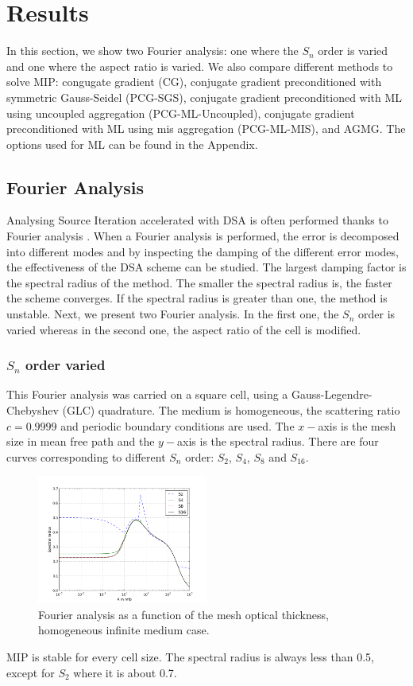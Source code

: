 \section{Results} \label{sec_res}
In this section, we show two Fourier analysis: one where the $S_n$ order is
varied and one where the aspect ratio is varied. We also compare different
methods to solve MIP: congugate gradient (CG), conjugate gradient
preconditioned with symmetric Gauss-Seidel (PCG-SGS), conjugate gradient
preconditioned with ML using uncoupled aggregation (PCG-ML-Uncoupled),
conjugate gradient preconditioned with ML using mis aggregation (PCG-ML-MIS),
and AGMG. The options used for ML can be found in the Appendix.
\subsection{Fourier Analysis}
Analysing Source Iteration accelerated with DSA is often performed thanks to
Fourier analysis \cite{larsen_dsa,consistent_p1}. When a Fourier analysis is
performed, the error is decomposed into different modes and by inspecting the 
damping of the different error modes, the effectiveness of the DSA scheme can 
be studied. The largest damping factor is the spectral radius of the method. 
The smaller the spectral radius is, the faster the scheme converges. If the 
spectral radius is greater than one, the method is unstable. Next, we present 
two Fourier analysis. In the first one, the $S_n$ order is varied whereas in 
the second one, the aspect ratio of the cell is modified.
\subsubsection{$S_n$ order varied}
This Fourier analysis was carried on a square cell, using a
Gauss-Legendre-Chebyshev (GLC) quadrature. The medium is homogeneous, the scattering
ratio $c=0.9999$ and periodic boundary conditions are used. The $x-$axis is the mesh
size in mean free path and the $y-$axis is the spectral radius. There are four
curves corresponding to different $S_n$ order: $S_2$, $S_4$, $S_8$ and
$S_{16}$.
\begin{figure}[H]
\centering
\includegraphics[width=0.5\textwidth]{./Dsa/sn_order_9999}
\caption{Fourier analysis as a function of the mesh optical thickness,
homogeneous infinite medium case.}
\end{figure}
MIP is stable for every cell size. The spectral radius is always less than
0.5, except for $S_2$ where it is about 0.7.
